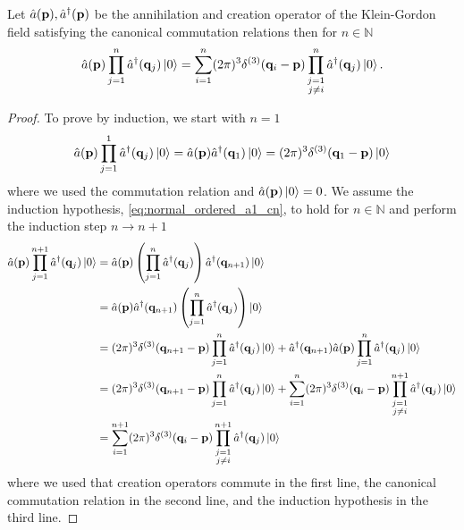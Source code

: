 \begin{lemma}\label{th:normal_ordered_a1_cn}
	Let $\hat{a}(\vb{p}),\hat{a}^\dagger(\vb{p})$ be the annihilation and creation operator of the Klein-Gordon field satisfying the canonical commutation relations then for $n\in\mathbb{N}$
	\begin{equation}
		\hat{a}(\vb{p})
		\prod_{j=1}^n
		\hat{a}^\dagger(\vb{q}_j)
		\ket{0}
		=
		\sum_{i=1}^n
		(2\pi)^3
		\delta^{(3)}(\vb{q}_i-\vb{p})
		\prod_{\substack{j=1\\j\neq i}}^n
		\hat{a}^\dagger(\vb{q}_j)
		\ket{0}
		\label{eq:normal_ordered_a1_cn}
		.
	\end{equation}
\end{lemma}
\begin{proof}
	To prove by induction, we start with $n=1$
	\begin{equation*}
		\hat{a}(\vb{p})
		\prod_{j=1}^1
		\hat{a}^\dagger(\vb{q}_j)
		\ket{0}
		=
		\hat{a}(\vb{p})
		\hat{a}^\dagger(\vb{q}_1)
		\ket{0}
		=
		(2\pi)^3
		\delta^{(3)}(\vb{q}_1-\vb{p})
		\ket{0}
	\end{equation*}
	where we used the commutation relation and $\hat{a}(\vb{p})\ket{0}=0$.
	We assume the induction hypothesis, \cref{eq:normal_ordered_a1_cn}, to hold for $n\in\mathbb{N}$ and perform the induction step $n\to n+1$
	\begin{equation*}
		\begin{split}
			\hat{a}(\vb{p})
			\prod_{j=1}^{n+1}
			\hat{a}^\dagger(\vb{q}_j)
			\ket{0}
			&=
			\hat{a}(\vb{p})
			\left(
				\prod_{j=1}^n
				\hat{a}^\dagger(\vb{q}_j)
			\right)
			\hat{a}^\dagger(\vb{q}_{n+1})
			\ket{0}
			\\
			&=
			\hat{a}(\vb{p})
			\hat{a}^\dagger(\vb{q}_{n+1})
			\left(
				\prod_{j=1}^n
				\hat{a}^\dagger(\vb{q}_j)
			\right)
			\ket{0}
			\\
			&=
			(2\pi)^3
			\delta^{(3)}(\vb{q}_{n+1}-\vb{p})
			\prod_{j=1}^n
			\hat{a}^\dagger(\vb{q}_j)
			\ket{0}
			+
			\hat{a}^\dagger(\vb{q}_{n+1})
			\hat{a}(\vb{p})
			\prod_{j=1}^n
			\hat{a}^\dagger(\vb{q}_j)
			\ket{0}
			\\
			&=
			(2\pi)^3
			\delta^{(3)}(\vb{q}_{n+1}-\vb{p})
			\prod_{j=1}^n
			\hat{a}^\dagger(\vb{q}_j)
			\ket{0}
			+
			\sum_{i=1}^n
			(2\pi)^3
			\delta^{(3)}(\vb{q}_i-\vb{p})
			\prod_{\substack{j=1\\j\neq i}}^{n+1}
			\hat{a}^\dagger(\vb{q}_j)
			\ket{0}
			\\
			&=
			\sum_{i=1}^{n+1}
			(2\pi)^3
			\delta^{(3)}(\vb{q}_i-\vb{p})
			\prod_{\substack{j=1\\j\neq i}}^{n+1}
			\hat{a}^\dagger(\vb{q}_j)
			\ket{0}
		\end{split}
	\end{equation*}
	where we used that creation operators commute in the first line, the canonical commutation relation in the second line, and the induction hypothesis in the third line.
\end{proof}

